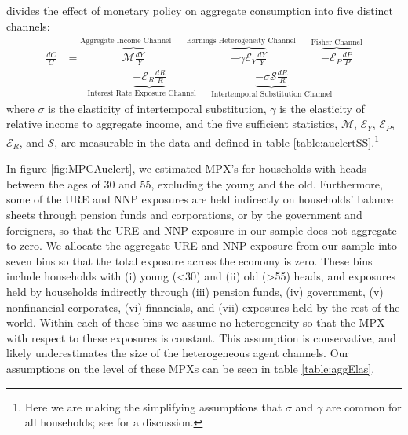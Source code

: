 \documentclass[titlepage]{\econtex}\newcommand{\texname}{ConsumptionHeterogeneity}
\begin{document}
	\cite{auclert_monetary_2017} divides the effect of monetary policy on aggregate consumption into five distinct channels:
	\begingroup
	\allowdisplaybreaks[0]
	\begin{align} 
	\frac{dC}{C} &= \overbrace{\mathcal{M}\frac{dY}{Y}}^{\text{Aggregate Income Channel}\qquad} \overbrace{ + \gamma \mathcal{E}_Y \frac{dY}{Y}}^{\text{Earnings Heterogeneity Channel}\qquad} \overbrace{ - \mathcal{E}_P\frac{dP}{P}}^{\text{Fisher Channel}}  \nonumber \\
	& \qquad \underbrace{ + \mathcal{E}_R \frac{dR}{R}}_{\text{Interest Rate Exposure Channel}\qquad}  \underbrace{ - \sigma \mathcal{S}\frac{dR}{R}}_{\text{Intertemporal Substitution Channel}} \label{auclert_channels}
	\end{align}
	\endgroup
	where $\sigma$ is the elasticity of intertemporal substitution, $\gamma$ is the elasticity of relative income to aggregate income, and the five sufficient statistics, $\mathcal{M}$, $\mathcal{E}_Y$, $\mathcal{E}_P$, $\mathcal{E}_R$, and $\mathcal{S}$, are measurable in the data and defined in table \ref{table:auclertSS}.\footnote{Here we are making the simplifying assumptions that $\sigma$ and $\gamma$ are common for all households; see \cite{auclert_monetary_2017} for a discussion.}
	
	In figure \ref{fig:MPCAuclert}, we estimated MPX's for households with heads between the ages of 30 and 55, excluding the young and the old. Furthermore, some of the URE and NNP exposures are held indirectly on households' balance sheets through pension funds and corporations, or by the government and foreigners, so that the URE and NNP exposure in our sample does not aggregate to zero. We allocate the aggregate URE and NNP exposure from our sample into seven bins so that the total exposure across the economy is zero. These bins include households with (i) young (<30) and (ii) old (>55) heads, and exposures held by households indirectly through (iii) pension funds, (iv) government, (v) nonfinancial corporates, (vi) financials, and (vii) exposures held by the rest of the world. Within each of these bins we assume no heterogeneity so that the MPX with respect to these exposures is constant. This assumption is conservative, and likely underestimates the size of the heterogeneous agent channels. Our assumptions on the level of these MPXs can be seen in table \ref{table:aggElas}.
	
\end{document}
